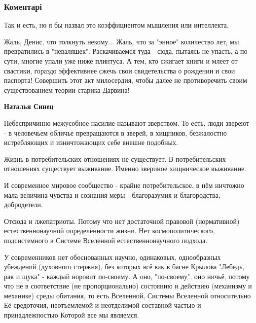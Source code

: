  
 
 
 
 
\subsubsection{Коментарі}

\begin{itemize} %
Так и есть, но я бы назвал это коэффициентом мышления или интеллекта.


Жаль, Денис, что толкнуть некому... Жаль, что за "энное" количество лет, мы
превратились в "неваляшек". Раскачиваемся туда - сюда, пытаясь не упасть, а по
сути, многие упали уже ниже плинтуса. А тем, кто сжигает книги и млеет от
свастики, гораздо эффективнее сжечь свои свидетельства о рождении и свои
паспорта! Совершить этот акт милосердия, чтобы далее не противоречить своим
существованием теории старика Дарвина!

\begin{itemize} %

 
\textbf{Наталья Синец} 

Небеспричинно межусобное насилие называют зверством. То есть, люди звереют - в
человечьем обличье превращаются в зверей, в хищников, безжалостно истребляющих
и изничтожающих себе внешне подобных.

Жизнь в потребительских отношениях не существует. В потребительских отношениях
существует выживание. Именно звериное хищническое выживание.

И современное мировое сообщество - крайне потребительское, в нём ничтожно мала
величина чувства и сознания меры - благоразумия и благородства, добродетели.

Отсюда и лжепатриоты. Потому что нет достаточной правовой (нормативной)
естественнонаучной определённости жизни. Нет космополитического, подсистемного
в Системе Вселенной естественнонаучного подхода.

У современников нет обоснованных научно, одинаковых, однообразных убеждений
(духовного стержня), без которых всё как в басне Крылова "Лебедь, рак и щука" -
каждый норовит по-своему. А оно, "по-своему", оно ничьё, потому что не в
соответствие (не пропорционально) состоянию и действию (механизму и механике)
среды обитания, то есть Вселенной, Системы Вселенной относительно Её
средоточия, неотъемлемой и неотделимой составной частью и принадлежностью
Которой все мы являемся.


\end{itemize}
\end{itemize}
